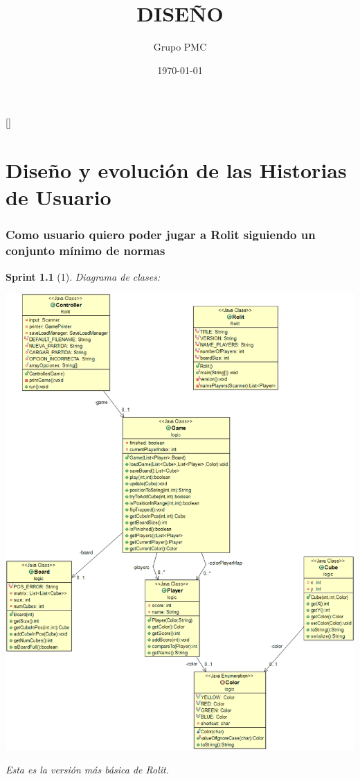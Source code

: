 \documentclass[12pt,a4paper,openright]{book}
\title{\Huge DISEÑO}
\date{\today}
\author{Grupo PMC}
\newcommand{\defaultformat}{
	\titleformat{\chapter}[display]{\centering\normalfont\huge\bfseries}{}{0pt}{\Huge \uppercase{##1}}[\titlerule]
    \titleformat{\section}{\normalfont\Large\bfseries}{}{0pt}{##1}
    \titleformat{\subsection}{\normalfont\large\bfseries}{}{0pt}{\uline{##1}}
    \titleformat{\subsubsection}{\normalfont\normalsize\bfseries}{}{0pt}{##1}
}
\theoremstyle{break}
\newtheorem*{sprint}{Sprint}
\begin{document}
\defaultformat
\maketitle
\setcounter{tocdepth}{3}
\setcounter{secnumdepth}{3}
\tableofcontents

\chapter{Diseño y evolución de las Historias de Usuario}

\subsection{Como usuario quiero poder jugar a Rolit siguiendo un conjunto mínimo de normas}

\begin{sprint}[1]
Diagrama de clases:
\begin{center}
\includegraphics[scale=0.29]{logicS1.png}
\end{center}
Esta es la versión más básica de Rolit.


\end{sprint}
\end{document}

